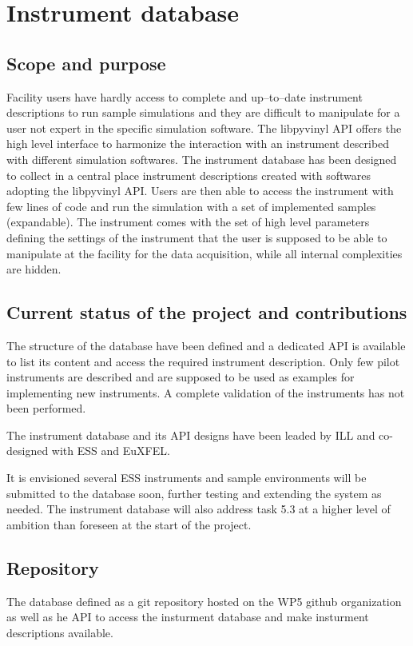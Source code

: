 \documentclass[11pt, a4paper]{article}
\begin{document}
\section{Instrument database}
\subsection{Scope and purpose}
Facility users have hardly access to complete and up--to--date instrument descriptions to run sample simulations and they are difficult to manipulate for a user not expert in the specific simulation software. 
The libpyvinyl API offers the high level interface to harmonize the interaction with an instrument described with different simulation softwares.
The instrument database has been designed to collect in a central place instrument descriptions created with softwares adopting the libpyvinyl API. Users are then able to access the instrument with few lines of code and run the simulation with a set of implemented samples (expandable). The instrument comes with the set of high level parameters defining the settings of the instrument that the user is supposed to be able to manipulate at the facility for the data acquisition, while all internal complexities are hidden.

\subsection{Current status of the project and contributions}
The structure of the database have been defined and a dedicated API is available to list its content and access the required instrument description.
Only few pilot instruments are described and are supposed to be used as examples for implementing new instruments.
A complete validation of the instruments has not been performed.

The instrument database and its API designs have been leaded by ILL and co-designed with ESS and EuXFEL.

It is envisioned several ESS instruments and sample environments will be submitted to the database soon, further testing and extending the system as needed. The instrument database will also address task 5.3 at a higher level of ambition than foreseen at the start of the project.

\subsection{Repository}
The database defined as a git repository hosted on the WP5 github organization as well as
he API to access the insturment database and make insturment descriptions available.
\end{document}
